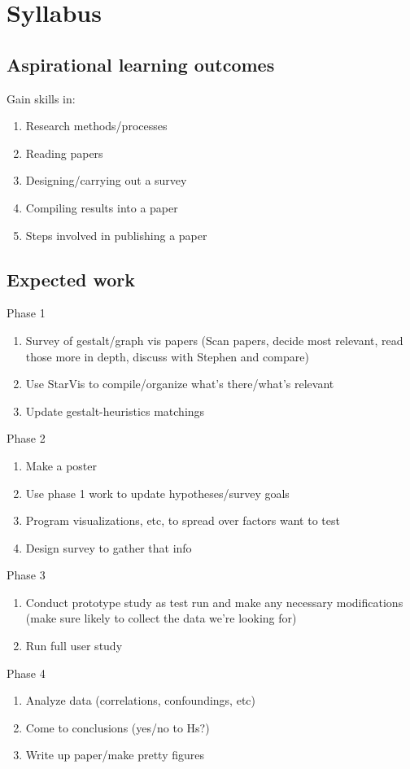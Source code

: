 \documentclass[12pt, twocolumn]{article}
\begin{document}
\newpage
\section{Syllabus}
\subsection{Aspirational learning outcomes}
Gain skills in:
\begin{enumerate}
	\item Research methods/processes
	\item Reading papers
	\item Designing/carrying out a survey
	\item Compiling results into a paper
	\item Steps involved in publishing a paper
\end{enumerate}
\subsection{Expected work}
Phase 1
\begin{enumerate}
	\item Survey of gestalt/graph vis papers (Scan papers, decide most relevant, read those more in depth, discuss with Stephen and compare)
	\item Use StarVis to compile/organize what's there/what's relevant
	\item Update gestalt-heuristics matchings
\end{enumerate}
Phase 2
\begin{enumerate}
	\item Make a poster
	\item Use phase 1 work to update hypotheses/survey goals
	\item Program visualizations, etc, to spread over factors want to test
	\item Design survey to gather that info
\end{enumerate}
Phase 3
\begin{enumerate}
	\item Conduct prototype study as test run and make any necessary modifications (make sure likely to collect the data we're looking for)
	\item Run full user study
\end{enumerate}
Phase 4
\begin{enumerate}
	\item Analyze data (correlations, confoundings, etc)
	\item Come to conclusions (yes/no to Hs?)
	\item Write up paper/make pretty figures
\end{enumerate}
\end{document}
